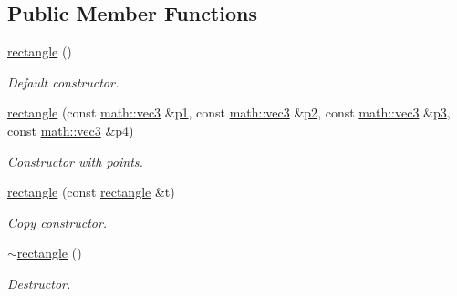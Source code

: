 \subsection*{Public Member Functions}
\begin{DoxyCompactItemize}
\item 
\mbox{\label{classphysim_1_1geometry_1_1rectangle_a19045fc142f3356ca3bf1070b71ea308}} 
\hyperlink{classphysim_1_1geometry_1_1rectangle_a19045fc142f3356ca3bf1070b71ea308}{rectangle} ()
\begin{DoxyCompactList}\small\item\em Default constructor. \end{DoxyCompactList}\item 
\hyperlink{classphysim_1_1geometry_1_1rectangle_a84f8d25d2d1d25a8efde6c66cc311e49}{rectangle} (const \hyperlink{structphysim_1_1math_1_1vec3}{math\+::vec3} \&\hyperlink{classphysim_1_1geometry_1_1rectangle_a1c5fe9b84a74fce16f20e54a7b77d0cd}{p1}, const \hyperlink{structphysim_1_1math_1_1vec3}{math\+::vec3} \&\hyperlink{classphysim_1_1geometry_1_1rectangle_af871a348483841bcd9b7dee07abd7f83}{p2}, const \hyperlink{structphysim_1_1math_1_1vec3}{math\+::vec3} \&\hyperlink{classphysim_1_1geometry_1_1rectangle_afb92c3176152c9874ed7af55e99f89f4}{p3}, const \hyperlink{structphysim_1_1math_1_1vec3}{math\+::vec3} \&p4)
\begin{DoxyCompactList}\small\item\em Constructor with points. \end{DoxyCompactList}\item 
\mbox{\label{classphysim_1_1geometry_1_1rectangle_afc7c2198666c116fd497fee6d2f13804}} 
\hyperlink{classphysim_1_1geometry_1_1rectangle_afc7c2198666c116fd497fee6d2f13804}{rectangle} (const \hyperlink{classphysim_1_1geometry_1_1rectangle}{rectangle} \&t)
\begin{DoxyCompactList}\small\item\em Copy constructor. \end{DoxyCompactList}\item 
\mbox{\label{classphysim_1_1geometry_1_1rectangle_a07b87fc059640225b79d9b78154167e4}} 
\hyperlink{classphysim_1_1geometry_1_1rectangle_a07b87fc059640225b79d9b78154167e4}{$\sim$rectangle} ()
\begin{DoxyCompactList}\small\item\em Destructor. \end{DoxyCompactList}\item 

\end{DoxyCompactItemize}
